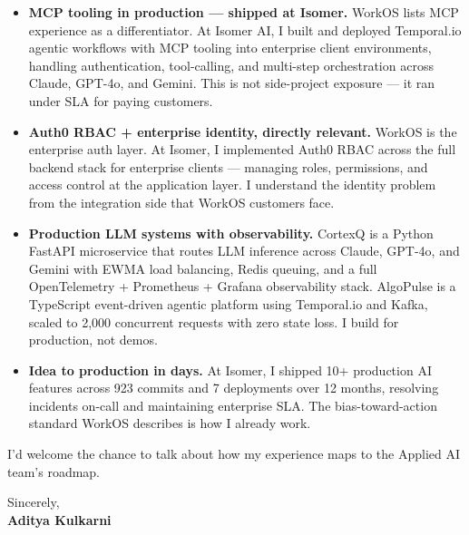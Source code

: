 \documentclass[11pt]{article}
\begin{document}
\begin{itemize}[leftmargin=1.2em, itemsep=4pt]
  \item[\textcolor{WorkOSPurple}{\faAngleRight}] \textbf{MCP tooling in production — shipped at Isomer.} WorkOS lists MCP experience as a differentiator. At Isomer AI, I built and deployed Temporal.io agentic workflows with MCP tooling into enterprise client environments, handling authentication, tool-calling, and multi-step orchestration across Claude, GPT-4o, and Gemini. This is not side-project exposure — it ran under SLA for paying customers.
  \item[\textcolor{WorkOSPurple}{\faAngleRight}] \textbf{Auth0 RBAC + enterprise identity, directly relevant.} WorkOS is the enterprise auth layer. At Isomer, I implemented Auth0 RBAC across the full backend stack for enterprise clients — managing roles, permissions, and access control at the application layer. I understand the identity problem from the integration side that WorkOS customers face.
  \item[\textcolor{WorkOSPurple}{\faAngleRight}] \textbf{Production LLM systems with observability.} CortexQ is a Python FastAPI microservice that routes LLM inference across Claude, GPT-4o, and Gemini with EWMA load balancing, Redis queuing, and a full OpenTelemetry + Prometheus + Grafana observability stack. AlgoPulse is a TypeScript event-driven agentic platform using Temporal.io and Kafka, scaled to 2,000 concurrent requests with zero state loss. I build for production, not demos.
  \item[\textcolor{WorkOSPurple}{\faAngleRight}] \textbf{Idea to production in days.} At Isomer, I shipped 10+ production AI features across 923 commits and 7 deployments over 12 months, resolving incidents on-call and maintaining enterprise SLA. The bias-toward-action standard WorkOS describes is how I already work.
\end{itemize}

\vspace{8pt}

I'd welcome the chance to talk about how my experience maps to the Applied AI team's roadmap.

\vspace{10pt}

Sincerely, \\[4pt]
\textbf{Aditya Kulkarni}
\end{document}
